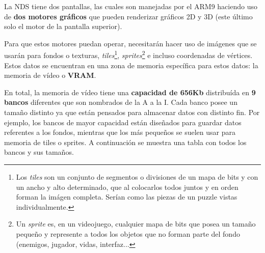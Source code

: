 La NDS tiene dos pantallas, las cuales son manejadas por el ARM9 haciendo uso de \textbf{dos motores gráficos} que pueden renderizar gráficos 2D y 3D (este último solo el motor de la pantalla superior).

\vspace{0.5cm}

Para que estos motores puedan operar, necesitarán hacer uso de imágenes que se usarán para fondos o texturas, \textit{tiles}\footnote{Los \textit{tiles} son un conjunto de segmentos o divisiones de un mapa de bits y con un ancho y alto determinado, que al colocarlos todos juntos y en orden forman la imágen completa. Serían como las piezas de un puzzle vistas individualmente.}, \textit{sprites}\footnote{Un \textit{sprite} es, en un videojuego, cualquier mapa de bits que posea un tamaño pequeño y represente a todos los objetos que no forman parte del fondo (enemigos, jugador, vidas, interfaz...} e incluso coordenadas de vértices. Estos datos se encuentran en una zona de memoria específica para estos datos: la memoria de vídeo o \textbf{VRAM}.

\vspace{0.5cm}

En total, la memoria de vídeo tiene una \textbf{capacidad de 656Kb} distribuída en \textbf{9 bancos} diferentes que son nombrados de la A a la I. Cada banco posee un tamaño distinto ya que están pensados para almacenar datos con distinto fin. Por ejemplo, los bancos de mayor capacidad están diseñados para guardar datos referentes a los fondos, mientras que los más pequeños se suelen usar para memoria de tiles o sprites. A continuación se muestra una tabla con todos los bancos y sus tamaños.

\vspace{0.5cm}

